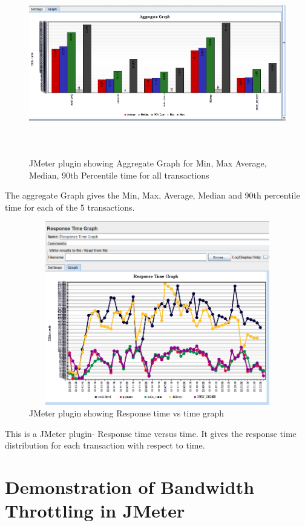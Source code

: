 \documentclass[12pt]{book}
\begin{document}
  \begin{figure}[H]
    \centering
    \includegraphics[width=15cm, height=8cm]{images/ntpcc_97}
    \caption{JMeter plugin showing Aggregate Graph for Min,  Max Average,  Median,  90th Percentile time for all transactions\label{fig:fig81_JMeter}}
   \end{figure}
  The aggregate Graph gives the Min, Max, Average, Median and 90th percentile time for each of the 5 transactions.
  
  \begin{figure}[H]
    \centering
    \includegraphics[width=15cm, height=8cm]{images/ntpcc_98}
    \caption{JMeter plugin showing Response time vs time graph\label{fig:fig82_JMeter}}
   \end{figure}
   This is a JMeter plugin- Response time versus time. It gives the response time distribution for each transaction with respect to time.
  
 \section{Demonstration of Bandwidth Throttling in JMeter}
 
\end{document}
